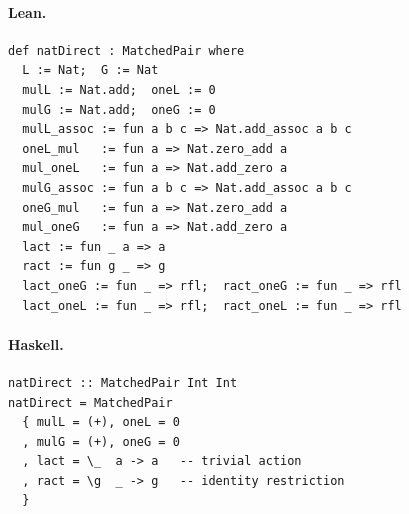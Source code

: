 \documentclass[11pt,a4paper]{article}
\begin{document}
\paragraph{Lean.}
\begin{lstlisting}[style=lean]
def natDirect : MatchedPair where
  L := Nat;  G := Nat
  mulL := Nat.add;  oneL := 0
  mulG := Nat.add;  oneG := 0
  mulL_assoc := fun a b c => Nat.add_assoc a b c
  oneL_mul   := fun a => Nat.zero_add a
  mul_oneL   := fun a => Nat.add_zero a
  mulG_assoc := fun a b c => Nat.add_assoc a b c
  oneG_mul   := fun a => Nat.zero_add a
  mul_oneG   := fun a => Nat.add_zero a
  lact := fun _ a => a
  ract := fun g _ => g
  lact_oneG := fun _ => rfl;  ract_oneG := fun _ => rfl
  lact_oneL := fun _ => rfl;  ract_oneL := fun _ => rfl
\end{lstlisting}

\paragraph{Haskell.}
\begin{lstlisting}[style=haskell]
natDirect :: MatchedPair Int Int
natDirect = MatchedPair
  { mulL = (+), oneL = 0
  , mulG = (+), oneG = 0
  , lact = \_  a -> a   -- trivial action
  , ract = \g  _ -> g   -- identity restriction
  }
\end{lstlisting}
\end{document}
